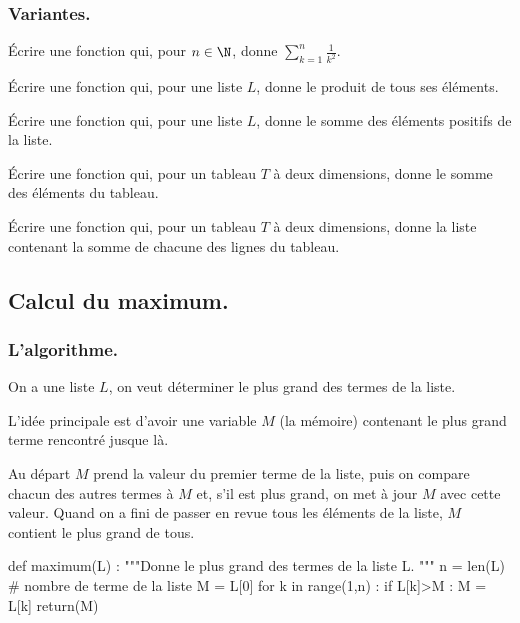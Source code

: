 \documentclass[french,11pt,twoside]{VcCours}
\begin{document}
\pagebreak
\subsubsection{Variantes.}
\begin{Exercice}{}
Écrire une fonction  qui, pour $n\in\N$, donne
$\sum_{k=1}^n\frac{1}{k^2}$.
\end{Exercice}

\begin{Exercice}{}
Écrire une fonction  qui, pour une liste $L$, donne
le produit de tous ses éléments.
\end{Exercice}

\begin{Exercice}{}
Écrire une fonction  qui, pour une
liste $L$, donne le somme des éléments positifs de la liste.
\end{Exercice}

\begin{Exercice}{}
Écrire une fonction  qui, pour un
tableau $T$ à deux dimensions, donne le somme des éléments du tableau.
\end{Exercice}

\begin{Exercice}{}
Écrire une fonction  qui, pour un
tableau $T$ à deux dimensions, donne la liste contenant la somme de
chacune des lignes du tableau.
\end{Exercice}

\newpage
\subsection{Calcul du maximum.}
\subsubsection{L'algorithme.}
On a une liste $L$, on veut déterminer le plus grand des termes
de la liste.

L'idée principale est d'avoir une variable $M$ (la mémoire)
contenant le plus grand terme rencontré jusque là.

Au départ $M$ prend la valeur du premier terme de la liste, puis on compare
chacun des autres termes à $M$ et, s'il est plus grand, on met à jour $M$ avec
cette valeur.
Quand on a fini de passer en revue tous les éléments de la liste, $M$ contient
le plus grand de tous.

\begin{Python}
def maximum(L) :
    """Donne le plus grand des termes de la liste L.
    """
    n = len(L) # nombre de terme de la liste
    M = L[0]
    for k in range(1,n) :
        if L[k]>M :
            M = L[k]
    return(M)
\end{Python}
\end{document}
